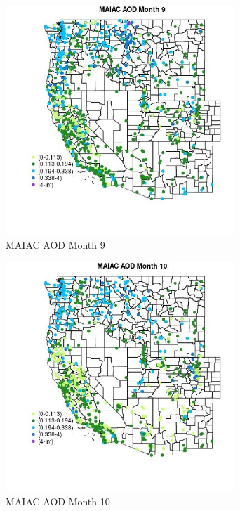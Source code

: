 \begin{figure} 
\centering  
\includegraphics[width=0.77\textwidth]{Code_Outputs/Report_ML_input_PM25_Step4_part_f_de_duplicated_aveswNAs_MapObsMo9MAIAC_AOD.jpg} 
\caption{\label{fig:Report_ML_input_PM25_Step4_part_f_de_duplicated_aveswNAsMapObsMo9MAIAC_AOD}MAIAC AOD Month 9} 
\end{figure} 
 

\begin{figure} 
\centering  
\includegraphics[width=0.77\textwidth]{Code_Outputs/Report_ML_input_PM25_Step4_part_f_de_duplicated_aveswNAs_MapObsMo10MAIAC_AOD.jpg} 
\caption{\label{fig:Report_ML_input_PM25_Step4_part_f_de_duplicated_aveswNAsMapObsMo10MAIAC_AOD}MAIAC AOD Month 10} 
\end{figure} 
 

